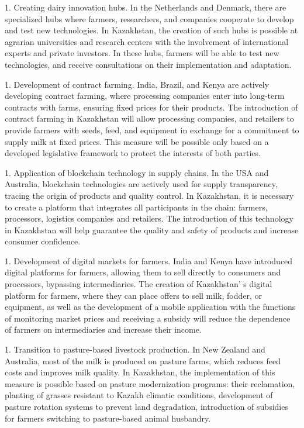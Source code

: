 1. Creating dairy innovation hubs. In the Netherlands and Denmark, there
are specialized hubs where farmers, researchers, and companies
cooperate to develop and test new technologies. In Kazakhstan, the
creation of such hubs is possible at agrarian universities and
research centers with the involvement of international experts and
private investors. In these hubs, farmers will be able to test new
technologies, and receive consultations on their implementation and
adaptation.

1. Development of contract farming. India, Brazil, and Kenya are actively
developing contract farming, where processing companies enter into
long-term contracts with farms, ensuring fixed prices for their
products. The introduction of contract farming in Kazakhstan will
allow processing companies, and retailers to provide farmers with
seeds, feed, and equipment in exchange for a commitment to supply milk
at fixed prices. This measure will be possible only based on a
developed legislative framework to protect the interests of both
parties.

1. Application of blockchain technology in supply chains. In the USA and
Australia, blockchain technologies are actively used for supply
transparency, tracing the origin of products and quality control. In
Kazakhstan, it is necessary to create a platform that integrates all
participants in the chain: farmers, processors, logistics companies
and retailers. The introduction of this technology in Kazakhstan will
help guarantee the quality and safety of products and increase
consumer confidence.

1. Development of digital markets for farmers. India and Kenya have
introduced digital platforms for farmers, allowing them to sell
directly to consumers and processors, bypassing intermediaries. The
creation of Kazakhstan' s digital platform for farmers,
where they can place offers to sell milk, fodder, or equipment, as
well as the development of a mobile application with the functions of
monitoring market prices and receiving a subsidy will reduce the
dependence of farmers on intermediaries and increase their income.

1. Transition to pasture-based livestock production. In New Zealand and
Australia, most of the milk is produced on pasture farms, which
reduces feed costs and improves milk quality. In Kazakhstan, the
implementation of this measure is possible based on pasture
modernization programs: their reclamation, planting of grasses
resistant to Kazakh climatic conditions, development of pasture
rotation systems to prevent land degradation, introduction of
subsidies for farmers switching to pasture-based animal husbandry.

